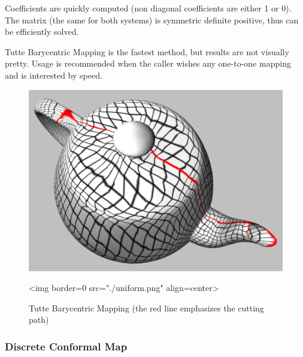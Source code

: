 Coefficients are quickly computed (non diagonal coefficients
are either 1 or 0). The matrix (the same for both systems) is
symmetric definite positive, thus can be efficiently solved.

Tutte Barycentric Mapping is the fastest method, but results are not visually pretty.
Usage is recommended when the caller wishes any one-to-one mapping and is
interested by speed.

\begin{figure}[bht]
    \begin{center}
        \begin{ccTexOnly}
            \includegraphics{Parameterization/uniform} %
        \end{ccTexOnly}
        \begin{ccHtmlOnly}
            <img border=0 src="./uniform.png" align=center>
        \end{ccHtmlOnly}
        \label{parameterization-fig-uniform}

        \caption{Tutte Barycentric Mapping (the red line emphasizes the cutting path)}
    \end{center}
\end{figure}


\subsubsection{Discrete Conformal Map}

  \\

